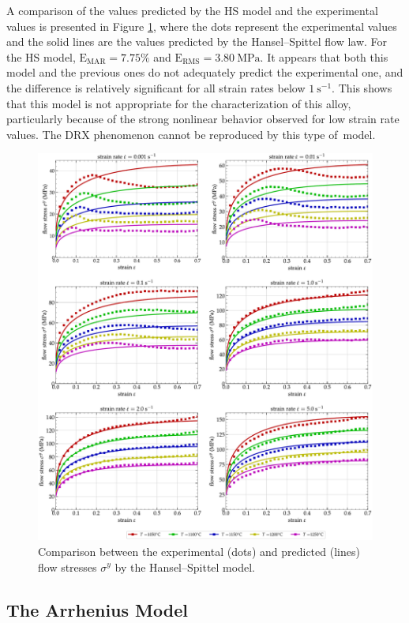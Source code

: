 \documentclass[metals,article,accept,pdftex,moreauthors]{Definitions/mdpi}
\DeclareRobustCommand{\RMSE}{\text{E}_\text{RMS}}
\DeclareRobustCommand{\MARE}{\text{E}_\text{MAR}}
\DeclareRobustCommand{\ps}{\text{s}^{-1}}
\DeclareRobustCommand{\MPa}{\text{MPa}}
\begin{document}
A comparison of the values predicted by the HS model and the experimental values is presented in Figure \ref{fig:CompExp-HS-6}, where the dots represent the experimental values and the solid lines are the values predicted by the Hansel--Spittel flow law.
For the HS model, \mbox{$\MARE=7.75\%$} and $\RMSE=3.80~\MPa$.
It appears that both this model and the previous ones do not adequately predict the experimental one, and the difference is relatively significant for all strain rates below $1~\ps$.
This shows that this model is not appropriate for the characterization of this alloy, particularly because of the strong nonlinear behavior observed for low strain rate values.
The DRX phenomenon cannot be reproduced by this type of~model.

\begin{figure}[H]

\includegraphics[width=0.9\columnwidth]
{Figures/CompExp-HS-6}
\caption{Comparison between the experimental (dots) and predicted (lines) flow stresses $\sigma^y$ by the Hansel--Spittel model.}
\label{fig:CompExp-HS-6}
\end{figure}

\subsection{The Arrhenius Model\label{sec:ARmodel}}
\end{document}
